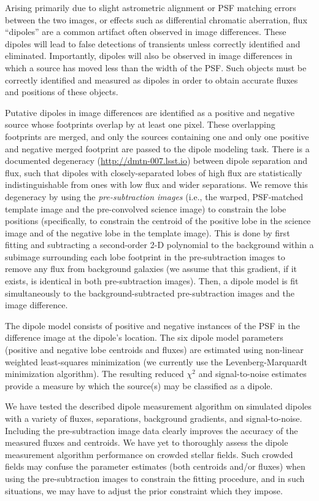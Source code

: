 Arising primarily due to slight astrometric alignment or PSF matching errors between the two images, or effects such as differential chromatic aberration, flux “dipoles” are a common artifact often observed in image differences. These dipoles will lead to false detections of transients unless correctly identified and eliminated. Importantly, dipoles will also be observed in image differences in which a source has moved less than the width of the PSF. Such objects must be correctly identified and measured as dipoles in order to obtain accurate fluxes and positions of these objects. 

Putative dipoles in image differences are identified as a positive and negative source whose footprints overlap by at least one pixel. These overlapping footprints are merged, and only the sources containing one and only one positive and negative merged footprint are passed to the dipole modeling task. There is a documented degeneracy (\url{http://dmtn-007.lsst.io}) between dipole separation and flux, such that dipoles with closely-separated lobes of high flux are statistically indistinguishable from ones with low flux and wider separations. We remove this degeneracy by using the {\em pre-subtraction images} (i.e., the warped, PSF-matched template image and the pre-convolved science image) to constrain the lobe positions (specifically, to constrain the centroid of the positive lobe in the science image and of the negative lobe in the template image). This is done by first fitting and subtracting a second-order 2-D polynomial to the background within a subimage surrounding each lobe footprint in the pre-subtraction images to remove any flux from background galaxies (we assume that this gradient, if it exists, is identical in both pre-subtraction images). Then, a dipole model is fit simultaneously to the background-subtracted pre-subtraction images and the image difference. 

The dipole model consists of positive and negative instances of the PSF in the difference image at the dipole's location. The six dipole model parameters (positive and negative lobe centroids and fluxes) are estimated using non-linear weighted least-squares minimization (we currently use the Levenberg-Marquardt minimization algorithm). The resulting reduced $\chi^2$ and signal-to-noise estimates provide a measure by which the source(s) may be classified as a dipole. 

We have tested the described dipole measurement algorithm on simulated dipoles with a variety of fluxes, separations, background gradients, and signal-to-noise. Including the pre-subtraction image data clearly improves the accuracy of the measured fluxes and centroids. We have yet to thoroughly assess the dipole measurement algorithm performance on crowded stellar fields. Such crowded fields may confuse the parameter estimates (both centroids and/or fluxes) when using the pre-subtraction images to constrain the fitting procedure, and in such situations, we may have to adjust the prior constraint which they impose.

